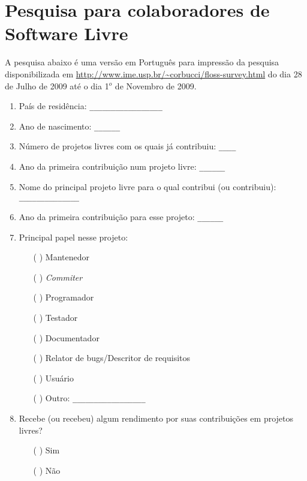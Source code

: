 \chapter{Pesquisa para colaboradores de Software Livre}
\label{ape:OS}

\singlespacing

A pesquisa abaixo é uma versão em Português para impressão da pesquisa
disponibilizada em
\url{http://www.ime.usp.br/~corbucci/floss-survey.html} do dia 28 de
Julho de 2009 até o dia 1$^o$ de Novembro de 2009.

\begin{enumerate}
\item País de residência: \verb=_________________=

\item Ano de nascimento: \verb=______=

\item Número de projetos livres com os quais já contribuiu:
  \verb=____=

\item Ano da primeira contribuição num projeto livre: \verb=______=

\item Nome do principal projeto livre para o qual contribui (ou
  contribuiu): \verb= ______________=

\item Ano da primeira contribuição para esse projeto: \verb=______=

\item Principal papel nesse projeto:
  \begin{itemize}
  \item[( )] Mantenedor
  \item[( )] \textit{Commiter}
  \item[( )] Programador
  \item[( )] Testador
  \item[( )] Documentador
  \item[( )] Relator de bugs/Descritor de requisitos
  \item[( )] Usuário
  \item[( )] Outro: \verb=_________________=
  \end{itemize}

\item Recebe (ou recebeu) algum rendimento por suas contribuições em
  projetos livres?
  \begin{itemize}
  \item[( )] Sim
  \item[( )] Não
  \end{itemize}


\end{enumerate}
